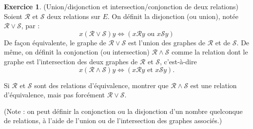 \documentclass[11pt,a4paper]{article}
\theoremstyle{definition}
\newtheorem{exo}{Exercice}
\newcommand{\exercice}[1]{} \newcommand{\finexercice}{}
\newcommand{\enonce}{\begin{exo}} \newcommand{\finenonce}{\end{exo}}
\newcommand{\noindication}{\stepcounter{ind}}
\newcommand{\nocorrection}{\stepcounter{cor}}
\begin{document}
\noindication

\nocorrection

\finexercice
\exercice{7208, megy, 2019/07/23}

\enonce
(Union/disjonction et intersection/conjonction de deux relations)
Soient $\mathcal R$ et $\mathcal S$ deux relations sur $E$. On définit la disjonction (ou union), notée $\mathcal R \vee \mathcal S$, par : 
\[ x (\mathcal R \vee \mathcal S) y \iff (x \mathcal R y\text{ ou } x \mathcal S y)\]
De façon équivalente, le graphe de $\mathcal R \vee \mathcal S$ est l'union des graphes de $\mathcal R$ et de $\mathcal S$. De même, on définit la conjonction (ou intersection) $\mathcal R \wedge \mathcal S$ comme la relation dont le graphe est l'intersection des deux graphes de $\mathcal R$ et $\mathcal S$, c'est-à-dire 
\[ x (\mathcal R \wedge \mathcal S) y \iff (x \mathcal R y\text{ et } x \mathcal S y).\]

Si $\mathcal R$ et $\mathcal S$ sont des relations d'équivalence, montrer que $\mathcal R \wedge \mathcal S$ est une relation d'équivalence, mais pas forcément $\mathcal R \vee \mathcal S$.

(Note : on peut définir la conjonction ou la disjonction d'un nombre quelconque de relations, à l'aide de l'union ou de l'intersection des graphes associés.)
\finenonce

\noindication

\nocorrection

\finexercice
\end{document}
